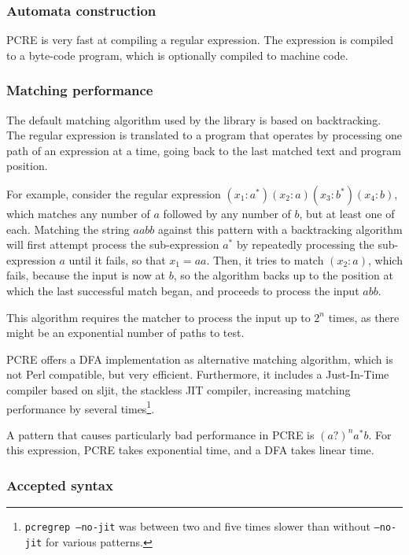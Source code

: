 \subsubsection{Automata construction}

PCRE is very fast at compiling a regular expression. The expression is compiled
to a byte-code program, which is optionally compiled to machine code.


\subsubsection{Matching performance}

The default matching algorithm used by the library is based on backtracking. The
regular expression is translated to a program that operates by processing one
path of an expression at a time, going back to the last matched text and program
position.

For example, consider the regular expression $(x_1:a^*)(x_2:a)(x_3:b^*)(x_4:b)$,
which matches any number of $a$ followed by any number of $b$, but at least one
of each. Matching the string $aabb$ against this pattern with a backtracking
algorithm will first attempt process the sub-expression $a^*$ by repeatedly
processing the sub-expression $a$ until it fails, so that $x_1 = aa$. Then, it
tries to match $(x_2:a)$, which fails, because the input is now at $b$, so the
algorithm backs up to the position at which the last successful match began, and
proceeds to process the input $abb$.

This algorithm requires the matcher to process the input up to $2^n$ times, as
there might be an exponential number of paths to test.

PCRE offers a DFA implementation as alternative matching algorithm, which is not
Perl compatible, but very efficient. Furthermore, it includes a Just-In-Time
compiler based on sljit, the stackless JIT compiler, increasing matching
performance by several times\footnote{\texttt{pcregrep --no-jit} was between two
and five times slower than without \texttt{--no-jit} for various patterns.}.

A pattern that causes particularly bad performance in PCRE is $(a?)^na^*b$. For
this expression, PCRE takes exponential time, and a DFA takes linear time.


\subsubsection{Accepted syntax}

